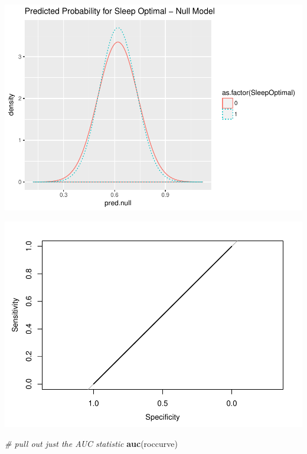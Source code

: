 \documentclass[]{article}
\newenvironment{Shaded}{\begin{snugshade}}{\end{snugshade}}
\newcommand{\KeywordTok}[1]{\textcolor[rgb]{0.13,0.29,0.53}{\textbf{{#1}}}}
\newcommand{\StringTok}[1]{\textcolor[rgb]{0.31,0.60,0.02}{{#1}}}
\newcommand{\CommentTok}[1]{\textcolor[rgb]{0.56,0.35,0.01}{\textit{{#1}}}}
\newcommand{\NormalTok}[1]{{#1}}
\begin{document}
\includegraphics{Hmwk7AnswerKey_files/figure-latex/unnamed-chunk-18-1.pdf}

\begin{Shaded}
\end{Shaded}

\includegraphics{Hmwk7AnswerKey_files/figure-latex/unnamed-chunk-18-2.pdf}

\begin{Shaded}
\begin{Highlighting}[]
\CommentTok{# pull out just the AUC statistic}
\KeywordTok{auc}\NormalTok{(roccurve)}
\end{Highlighting}
\end{Shaded}
\end{document}
